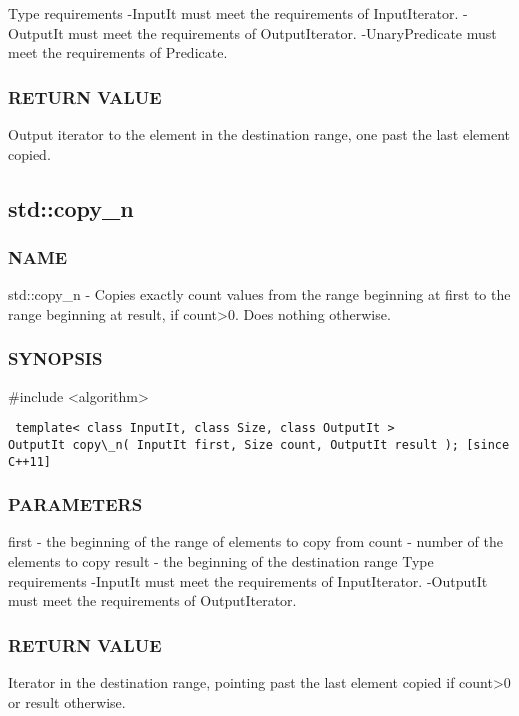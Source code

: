  Type requirements
 -InputIt must meet the requirements of InputIterator.
 -OutputIt must meet the requirements of OutputIterator.
 -UnaryPredicate must meet the requirements of Predicate.

\subsubsection{RETURN VALUE}
Output iterator to the element in the destination range, one past the last element copied.



\subsection{std::copy\_n}

\subsubsection{NAME}
std::copy\_n - Copies exactly count values from the range beginning at first to the range beginning at result, if count>0. Does nothing otherwise.

\subsubsection{SYNOPSIS}
\#include <algorithm>

\begin{lstlisting}
 template< class InputIt, class Size, class OutputIt >
OutputIt copy\_n( InputIt first, Size count, OutputIt result ); [since C++11]
\end{lstlisting}

\subsubsection{PARAMETERS}
first - the beginning of the range of elements to copy from
count - number of the elements to copy
result - the beginning of the destination range
 Type requirements
 -InputIt must meet the requirements of InputIterator.
 -OutputIt must meet the requirements of OutputIterator.

\subsubsection{RETURN VALUE}
Iterator in the destination range, pointing past the last element copied if count>0 or result otherwise.




